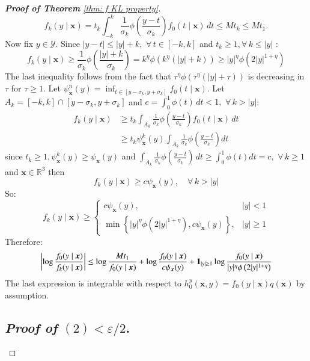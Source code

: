 \begin{proof}[\hypertarget{proof of thm KL property}{\textbf{Proof of Theorem}} \ref{thm: f KL property}]
$$
f_k(y \mid \boldsymbol{x})=t_k \int_{-k}^k \frac{1}{\sigma_k} \phi\left(\frac{y-t}{\sigma_k}\right) f_0(t \mid \boldsymbol{x}) \, d t \leq M t_k \leq M t_1.
$$
Now fix $y \in \mathcal{Y}$. Since $|y-t| \leq|y|+k, \, \, \forall \, t \in[-k, k]$ and $t_k \geqslant 1, \forall \, k \leqslant|y|$ :
$$
f_k(y \mid \boldsymbol{x}) \geq \frac{1}{\sigma_k} \phi\left(\frac{|y|+k}{\sigma_k}\right)={k}^\eta \phi(k^\eta (|y|+k)) \geq|y|^\eta \phi\left(2|y|^{1+\eta}\right)
$$
The last inequality follows from the fact that $\tau^{\eta} \phi(\tau^{\eta}(|y|+\tau))$ is decreasing in $\tau$ for $\tau \geq 1$.
Let $\psi_{\boldsymbol{x}}^n(y)=\inf _{t \in\left[y-\sigma_k, y+\sigma_k\right]} f_0(t \mid \boldsymbol{x})$. Let $A_k=[-k, k] \cap\left[y-\sigma_k, y+\sigma_k\right]$ and $c=\int_0^1 \phi(t) \, d t<1, \, \, \forall \, k>|y|$:
$$
\begin{aligned}
f_k(y \mid \boldsymbol{x}) & \geqslant t_k \int_{A_k} \frac{1}{\sigma_k} \phi\left(\frac{y-t}{\sigma_k}\right) f_0(t \mid \boldsymbol{x}) \, d t \\
& \geqslant t_k \psi_{\boldsymbol{x}}^k(y) \int_{A_k} \frac{1}{\sigma_k} \phi\left(\frac{y-t}{\sigma_k}\right) d t
\end{aligned}
$$
since $t_k \geq 1, \psi_{\boldsymbol{x}}^k(y) \geqslant \psi_{\boldsymbol{x}}(y)$ and $\int_{A_k} \frac{1}{\sigma_k} \phi\left(\frac{y-t}{\sigma_k}\right) \, d t \geq \int_0^1 \phi(t) d t=c, \, \, \forall \, k \geqslant 1$ and $\boldsymbol{x} \in \mathbb{R}^3$ then
$$
f_k(y \mid \boldsymbol{x}) \geqslant c \psi_{\boldsymbol{x}}(y), \quad \forall \, k>|y|
$$
So:
$$
f_k(y \mid \boldsymbol{x}) \geq\left\{\begin{array}{cl}
c \psi_{\boldsymbol{x}}(y), & |y|<1 \\
\min \left\{|y|^\eta \phi\left(2|y|^{1+\eta}\right), c \psi_{\boldsymbol{x}}(y)\right\}, & |y| \geqslant 1
\end{array}\right.
$$
Therefore:
$$
\begin{aligned}
\left|\log \frac{f_0(y \mid \boldsymbol{x})}{f_k(y \mid \boldsymbol{x})}\right| \leq \log \frac{M t_1}{f_0(y \mid \boldsymbol{x})}+\log \frac{f_0(y \mid \boldsymbol{x})}{c \psi_{\boldsymbol{x}}(y)}+\mathbf{1}_{|y|\geq 1} \log \frac{f_0(y \mid \boldsymbol{x})}{|y|^\eta \phi\left(2|y|^{1+\eta}\right)} 
\end{aligned}
$$
The last expression is integrable with respect to $h^y_0(\boldsymbol{x}, y)=f_0(y \mid \boldsymbol{x}) q(\boldsymbol{x})$ by assumption.

\subsection*{\textit{Proof of} $(2) < \varepsilon/2$.}


\end{proof}
